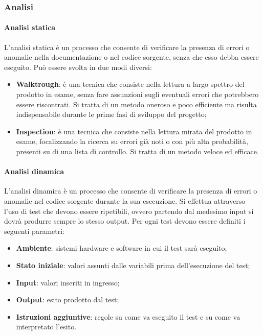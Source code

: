 \subsubsection{Analisi}
\paragraph{Analisi statica} \Spazio
L'analisi statica è un processo che consente di verificare la presenza di errori o anomalie nella documentazione o nel codice sorgente, senza che esso debba essere eseguito. Può essere svolta in due modi diversi:
\begin{itemize}
	\item \textbf{Walktrough}: è una tecnica che consiste nella lettura a largo spettro del prodotto in esame, senza fare assunzioni sugli eventuali errori che potrebbero essere riscontrati. Si tratta di un metodo oneroso e poco efficiente ma risulta indispensabile durante le prime fasi di sviluppo del progetto;
	\item \textbf{Inspection}: è una tecnica che consiste nella lettura mirata del prodotto in esame, focalizzando la ricerca su errori già noti o con più alta probabilità, presenti su di una lista di controllo. Si tratta di un metodo veloce ed efficace.
\end{itemize}

\paragraph{Analisi dinamica}
L'analisi dinamica è un processo che consente di verificare la presenza di errori o anomalie nel codice sorgente durante la sua esecuzione. Si effettua attraverso l'uso di test che devono essere ripetibili, ovvero partendo dal medesimo input si dovrà produrre sempre lo stesso output. Per ogni test devono essere definiti i seguenti parametri:
\begin{itemize}
	\item \textbf{Ambiente}: sistemi hardware e software in cui il test sarà eseguito;
	\item \textbf{Stato iniziale}: valori assunti dalle variabili prima dell'esecuzione del test;
	\item \textbf{Input}: valori inseriti in ingresso;
	\item \textbf{Output}: esito prodotto dal test;
	\item \textbf{Istruzioni aggiuntive}: regole su come va eseguito il test e su come va interpretato l'esito.
\end{itemize}


